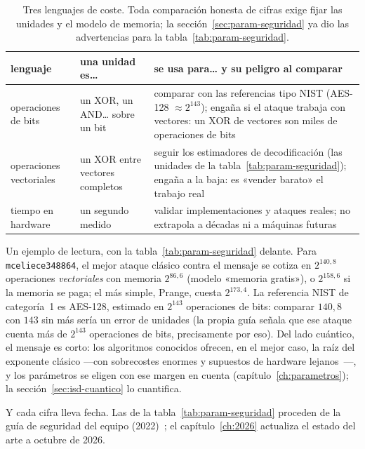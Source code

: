 \documentclass[11pt,a4paper,oneside]{report}
\begin{document}
\begin{table}[htbp]
\centering
\footnotesize
\setlength{\tabcolsep}{6pt}
\begin{tabular}{@{}p{3.2cm}p{4.4cm}p{6.8cm}@{}}
\toprule
lenguaje & una unidad es\ldots{} & se usa para\ldots{} y su
peligro al comparar\\
\midrule
operaciones de bits & un XOR, un AND\ldots{} sobre un bit &
comparar con las referencias tipo NIST (AES-128 $\approx2^{143}$);
engaña si el ataque trabaja con vectores: un XOR de vectores son
miles de operaciones de bits\\
operaciones vectoriales & un XOR entre vectores completos & seguir
los estimadores de decodificación (las unidades de la
tabla~\ref{tab:param-seguridad}); engaña a la baja: es «vender
barato» el trabajo real\\
tiempo en hardware & un segundo medido & validar implementaciones y
ataques reales; no extrapola a décadas ni a máquinas futuras\\
\bottomrule
\end{tabular}
\caption{Tres lenguajes de coste. Toda comparación honesta de cifras
exige fijar las unidades y el modelo de memoria; la
sección~\ref{sec:param-seguridad} ya dio las advertencias para la
tabla~\ref{tab:param-seguridad}.}
\label{tab:seg-costes}
\end{table}

Un ejemplo de lectura, con la tabla~\ref{tab:param-seguridad} delante.
Para \texttt{mceliece348864}, el mejor ataque clásico contra el
mensaje se cotiza en $2^{140{,}8}$ operaciones \emph{vectoriales} con
memoria $2^{86{,}6}$ (modelo «memoria gratis»), o $2^{158{,}6}$ si la
memoria se paga; el más simple, Prange, cuesta $2^{173{,}4}$. La
referencia NIST de categoría~1 es AES-128, estimado en $2^{143}$
operaciones de bits: comparar $140{,}8$ con $143$ sin más sería un
error de unidades (la propia guía señala que ese ataque cuenta más de
$2^{143}$ operaciones de bits, precisamente por eso). Del lado
cuántico, el mensaje es corto: los algoritmos conocidos ofrecen, en
el mejor caso, la raíz del exponente clásico ---con sobrecostes
enormes y supuestos de hardware lejanos~\cite{gidney2021}---, y los
parámetros se eligen con ese margen en cuenta
(capítulo~\ref{ch:parametros}); la
sección~\ref{sec:isd-cuantico} lo cuantifica.

Y cada cifra lleva fecha. Las de la
tabla~\ref{tab:param-seguridad} proceden de la guía de seguridad del
equipo (2022)~\cite{cmsecurity}; el capítulo~\ref{ch:2026} actualiza
el estado del arte a octubre de 2026.
\end{document}
